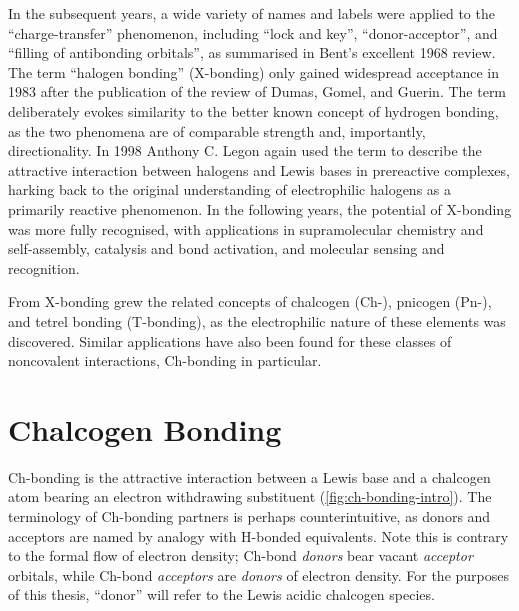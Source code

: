 \begin{refsection}
In the subsequent years, a wide variety of names and labels were applied to the ``charge-transfer'' phenomenon, including ``lock and key'', ``donor-acceptor'', and ``filling of antibonding orbitals'', as summarised in Bent's excellent 1968 review\autocite{Bent1968}.
The term ``halogen bonding'' (X-bonding) only gained widespread acceptance in 1983 after the publication of the review of Dumas, Gomel, and Guerin.\autocite{Dumas1983}
The term deliberately evokes similarity to the better known concept of hydrogen bonding, as the two phenomena are of comparable strength and, importantly, directionality.
In 1998 Anthony C. Legon again used the term to describe the attractive interaction between halogens and Lewis bases in prereactive complexes, harking back to the original understanding of electrophilic halogens as a primarily reactive phenomenon.\autocite{Legon1998,Legon1999}
In the following years, the potential of X-bonding was more fully recognised, with applications in supramolecular chemistry and self-assembly\autocite{Corradi2000,Metrangolo2008,Priimagi2013}, catalysis and bond activation\autocite{Walter2011,Soloshonok2017,Takagi2017}, and molecular sensing and recognition\autocite{Cornes2017,VargasJentzsch2013,Borissov2017}.

From X-bonding grew the related concepts of chalcogen (Ch-), pnicogen (Pn-), and tetrel bonding (T-bonding), as the electrophilic nature of these elements was discovered.\autocite{Murray2007}
Similar applications have also been found for these classes of noncovalent interactions, Ch-bonding in particular.\autocite{Fanfrlik2014,Garrett2016,Ho2016,Wonner2017,Mitchell2017,Benz2017,Biot2018,Ho2017}

\section{Chalcogen Bonding}
Ch-bonding is the attractive interaction between a Lewis base and a chalcogen atom bearing an electron withdrawing substituent (\cref{fig:ch-bonding-intro}).
The terminology of Ch-bonding partners is perhaps counterintuitive, as donors and acceptors are named by analogy with H-bonded equivalents.
Note this is contrary to the formal flow of electron density; Ch-bond \emph{donors} bear vacant \emph{acceptor} orbitals, while Ch-bond \emph{acceptors} are \emph{donors} of electron density.
For the purposes of this thesis, ``donor'' will refer to the Lewis acidic chalcogen species.


\end{refsection}
